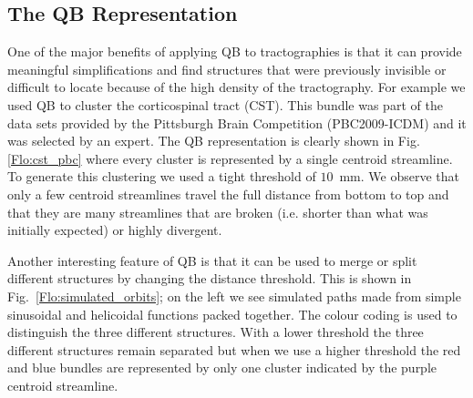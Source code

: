\documentclass{bioinfo}
\begin{document}

\subsection{The QB Representation\label{QB_Representation}}

One of the major benefits of applying QB to tractographies is that it
can provide meaningful simplifications and find structures that were
previously invisible or difficult to locate because of the high density
of the tractography. For example we used QB to cluster the corticospinal
tract (CST). This bundle was part of the data sets provided by the
Pittsburgh Brain Competition (PBC2009-ICDM) and it was selected by an
expert. The QB representation is clearly shown in Fig.\ref{Flo:cst_pbc}
where every cluster is represented by a single centroid streamline. To
generate this clustering we used a tight threshold of $10$~mm. We
observe that only a few centroid streamlines travel the full distance
from bottom to top and that they are many streamlines that are broken
(i.e. shorter than what was initially expected) or highly divergent.

Another interesting feature of QB is that it can be used to merge or
split different structures by changing the distance threshold.  This is
shown in Fig.~\ref{Flo:simulated_orbits}; on the left we see simulated
paths made from simple sinusoidal and helicoidal functions packed
together. The colour coding is used to distinguish the three different
structures. With a lower threshold the three different structures remain
separated but when we use a higher threshold the red and blue bundles
are represented by only one cluster indicated by the purple centroid
streamline.
\end{document}
